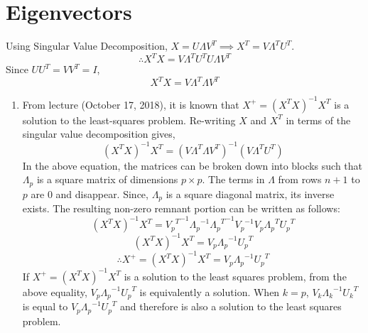 \documentclass[english]{article}
\begin{document}
\newpage
\section{Eigenvectors}
Using Singular Value Decomposition, $X = U{\Lambda}V^T \implies X^T = V{\Lambda}^TU^T$. 
$$\therefore X^TX = V{\Lambda}^TU^TU{\Lambda}V^T$$
Since $UU^T = VV^T = I$, 
$$X^TX = V{\Lambda}^T{\Lambda}V^T$$
\begin{enumerate}
\item From lecture (October 17, 2018), it is known that $X^+ = (X^TX)^{-1}X^T$ is a solution to the least-squares problem.
Re-writing $X$ and $X^T$ in terms of the singular value decomposition gives,
$$(X^TX)^{-1}X^T = (V{\Lambda}^T{\Lambda}V^T)^{-1}(V{\Lambda}^TU^T)$$
In the above equation, the matrices can be broken down into blocks such that ${\Lambda}_p$ is a square matrix of dimensions $p \times p$. The terms in ${\Lambda}$ from rows $n+1$ to $p$ are $0$ and disappear. Since, ${\Lambda}_p$ is a square diagonal matrix, its inverse exists. 
The resulting non-zero remnant portion can be written as follows:
$$(X^TX)^{-1}X^T = {{V_p}^T}^{-1}{\Lambda_p}^{-1}{{\Lambda_p}^T}^{-1}{V_p}^{-1}V_p{\Lambda_p}^T{U_p}^T$$
$$(X^TX)^{-1}X^T = V_p{\Lambda_p}^{-1}{U_p}^T$$
$$\therefore X^+ = (X^TX)^{-1}X^T = V_p{\Lambda_p}^{-1}{U_p}^T$$
If $X^+ = (X^TX)^{-1}X^T$ is a solution to the least squares problem, from the above equality, $V_p{\Lambda_p}^{-1}{U_p}^T$ is equivalently a solution. 
When $k = p$, $V_k{\Lambda_k}^{-1}{U_k}^T$ is equal to $V_p{\Lambda_p}^{-1}{U_p}^T$ and therefore is also a solution to the least squares problem. 



\end{enumerate}
\end{document}
